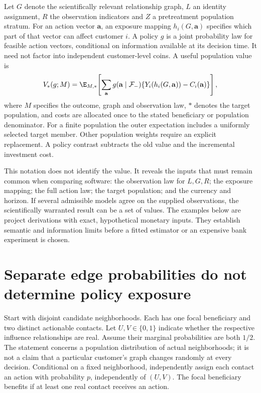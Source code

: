 Let $G$ denote the scientifically relevant relationship graph, $L$ an identity
assignment, $R$ the observation indicators and $Z$ a pretreatment population
stratum. For an action vector $\mathbf a$, an exposure mapping
$h_i(G,\mathbf a)$ specifies which part of that vector can affect customer $i$.
A policy $g$ is a joint probability law for feasible action vectors, conditional
on information available at its decision time. It need not factor into
independent customer-level coins. A useful population value is
\begin{equation}
 V_*(g;M)=\E_{M,*}\!\left[
   \sum_{\mathbf a}g(\mathbf a\mid\mathcal F_{-})
     \{Y_i(h_i(G,\mathbf a))-C_i(\mathbf a)\}\right],
 \label{exec17:s7-target}
\end{equation}
where $M$ specifies the outcome, graph and observation law, $*$ denotes the
target population, and costs are allocated once to the stated beneficiary or
population denominator. For a finite population the outer expectation includes
a uniformly selected target member. Other population weights require an
explicit replacement. A policy contrast subtracts the old value and the
incremental investment cost.

This notation does not identify the value. It reveals the inputs that must
remain common when comparing software: the observation law for $L,G,R$;
the exposure mapping; the full action law; the target population; and the
currency and horizon. If several admissible models agree on the supplied
observations, the scientifically warranted result can be a set of values.
The examples below are project derivations with exact, hypothetical monetary
inputs. They establish semantic and information limits before a fitted
estimator or an expensive bank experiment is chosen.~\citep{exec17_s7_math}

\section{Separate edge probabilities do not determine policy exposure}
\label{exec17:s7-overlap}

Start with disjoint candidate neighborhoods. Each has one focal beneficiary and
two distinct actionable contacts. Let $U,V\in\{0,1\}$ indicate whether the
respective influence relationships are real. Assume their marginal probabilities
are both $1/2$. The statement concerns a population distribution of actual
neighborhoods; it is not a claim that a particular customer's graph changes
randomly at every decision. Conditional on a fixed neighborhood, independently
assign each contact an action with probability $p$, independently of $(U,V)$.
The focal beneficiary benefits if at least one real contact receives an action.

